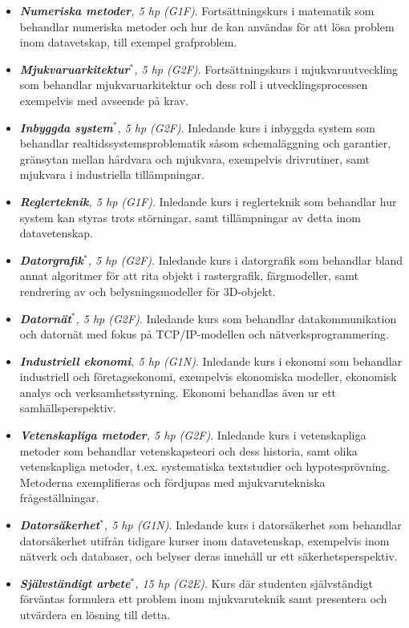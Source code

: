 \begin{itemize}
\tightlist
\item
  \emph{\textbf{Numeriska metoder}, 5 hp (G1F)}. Fortsättningskurs i
  matematik som behandlar numeriska metoder och hur de kan användas för
  att lösa problem inom datavetskap, till exempel grafproblem.
\item
  \emph{\textbf{Mjukvaruarkitektur}$^*$, 5 hp (G2F)}. Fortsättningskurs i
  mjukvaruutveckling som behandlar mjukvaruarkitektur och dess roll i
  utvecklingsprocessen exempelvis med avseende på krav.
\item
  \emph{\textbf{Inbyggda system}$^*$, 5 hp (G2F)}. Inledande kurs i inbyggda
  system som behandlar realtidssystemsproblematik såsom schemaläggning
  och garantier, gränsytan mellan hårdvara och mjukvara, exempelvis
  drivrutiner, samt mjukvara i industriella tillämpningar.
\item
  \emph{\textbf{Reglerteknik}, 5 hp (G1F)}. Inledande kurs i
  reglerteknik som behandlar hur system kan styras trots störningar,
  samt tillämpningar av detta inom datavetenskap.
\item
  \emph{\textbf{Datorgrafik}$^*$, 5 hp (G2F)}. Inledande kurs i datorgrafik
  som behandlar bland annat algoritmer för att rita objekt i rastergrafik,
  färgmodeller, samt rendrering av och belysningsmodeller för 3D-objekt.
\item
  \emph{\textbf{Datornät}$^*$, 5 hp (G2F)}. Inledande kurs som behandlar
  datakommunikation och datornät med fokus på TCP/IP-modellen och
  nätverksprogrammering.
\item
  \emph{\textbf{Industriell ekonomi}, 5 hp (G1N)}. Inledande kurs i ekonomi som behandlar industriell och företagsekonomi, exempelvis ekonomiska modeller, ekonomisk analys och verksamhetsstyrning. Ekonomi behandlas även ur ett samhällsperspektiv.  
\item
  \emph{\textbf{Vetenskapliga metoder}, 5 hp (G2F)}. Inledande kurs i vetenskapliga metoder som behandlar vetenskapsteori och dess historia,
samt olika vetenskapliga metoder, t.ex. systematiska textstudier och hypotesprövning. Metoderna exemplifieras och fördjupas med
mjukvarutekniska frågeställningar.
\item
  \emph{\textbf{Datorsäkerhet}$^*$, 5 hp (G1N)}. Inledande kurs i datorsäkerhet som behandlar
  datorsäkerhet utifrån tidigare kurser inom datavetenskap, exempelvis inom
  nätverk och databaser, och belyser deras innehåll ur ett
  säkerhetsperspektiv.
\item
  \emph{\textbf{Självständigt arbete}$^*$, 15 hp (G2E)}. Kurs där studenten självständigt förväntas formulera ett problem
  inom mjukvaruteknik samt presentera och utvärdera en lösning till
  detta.
\end{itemize}


